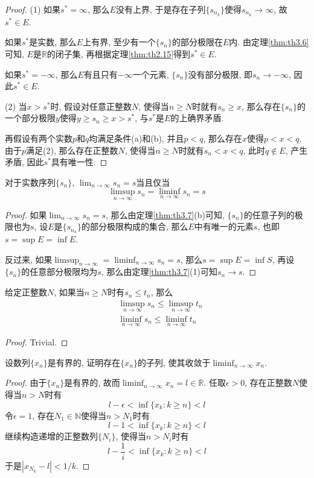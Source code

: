 \documentclass[cn,12pt,math=mtpro2,citestyle=gb7714-2015,bibstyle=gb7714-2015,twocol]{elegantbook}
\newcommand{\R}{\mathbb{R}}
\newcommand{\limn }{\lim_{n\to\infty}}
\begin{document}
\begin{proof}
  (1) 如果$s^\ast=\infty$, 那么$E$没有上界, 于是存在子列$\{s_{n_k}\}$使得$s_{n_k}\rightarrow\infty$, 故$s^\ast\in E$.

  如果$s^\ast$是实数, 那么$E$上有界, 至少有一个$\{s_n\}$的部分极限在$E$内. 由定理\ref{thm:th3.6}可知, $E$是$\R$的闭子集, 再根据定理\ref{thm:th2.15}得到$s^\ast\in E$.

  如果$s^\ast=-\infty$, 那么$E$有且只有$-\infty$一个元素, $\{s_n\}$没有部分极限, 即$s_n\rightarrow -\infty$, 因此$s^\ast\in E$.

  (2) 当$x>s^\ast$时, 假设对任意正整数$N$, 使得当$n\geq N$时就有$s_n\geq x$, 那么存在$\{s_n\}$的一个部分极限$y$使得$y\geq s_n\geq x>s^\ast$, 与$s^\ast$是$E$的上确界矛盾.

  再假设有两个实数$p$和$q$均满足条件(a)和(b), 并且$p<q$, 那么存在$x$使得$p<x<q$. 由于$p$满足(2), 那么存在正整数$N$, 使得当$n\geq N$时就有$s_n<x<q$, 此时$q\notin E$, 产生矛盾, 因此$s^\ast$具有唯一性.


\end{proof}
\begin{theorem}
  对于实数序列$\{s_n\}$, $\displaystyle\limn  s_n=s$当且仅当
  $$\limsup_{n\to\infty} s_n=\liminf_{n\to\infty} s_n=s$$
\end{theorem}
\begin{proof}
  如果$\limn  s_n=s$, 那么由定理\ref{thm:th3.7}(b)可知, $\{s_n\}$的任意子列的极限也为$s$, 设$E$是$\{s_{n_k}\}$的部分极限构成的集合, 那么$E$中有唯一的元素$s$, 也即$s=\sup E=\inf E$.

  反过来, 如果$\limsup_{n\to\infty}=\liminf_{n\to\infty} s_n=s$, 那么$s=\sup E=\inf S$, 再设$\{s_n\}$的任意部分极限均为$s$, 那么由定理\ref{thm:th3.7}(1)可知$s_n\rightarrow s$.


\end{proof}

\begin{theorem}\label{thm:th3.11}
  给定正整数$N$, 如果当$n\geq N$时有$s_n\leq t_n$, 那么
  \begin{align*}
  &\limsup_{n\to\infty} s_n\leq \limsup_{n\to\infty} t_n \\
  &\liminf_{n\to\infty} s_n\leq \liminf_{n\to\infty} t_n
  \end{align*}
\end{theorem}
\begin{proof}
  Trivial.
\end{proof}
\begin{example}
设数列$\{x_n\}$是有界的, 证明存在$\{x_n\}$的子列, 使其收敛于$\liminf_{n\to\infty} x_n$.
\end{example}
\begin{proof}
  由于$\{x_n\}$是有界的, 故而$\liminf_{n\to\infty}x_n=l\in \R$. 任取$\epsilon>0$, 存在正整数$N$使得当$n>N$时有
  $$l-\epsilon<\inf\{x_k: k\geq n\}<l$$
  令$\epsilon=1$, 存在$N_1\in\mathbb{N}$使得当$n>N_1$时有
  $$l-1<\inf\{x_k: k\geq n\}<l$$
  继续构造递增的正整数列$\{N_i\}$, 使得当$n>N_i$时有
  $$l-\frac{1}{i}<\inf\{x_k:k\geq n\}<l$$
  于是$|x_{N_k}-l|<1/k$.
\end{proof}
\end{document}
